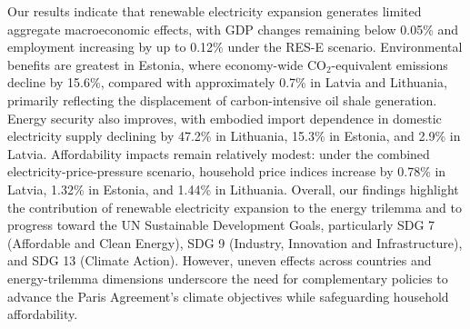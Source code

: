 \documentclass[10pt]{article}
\begin{document}
Our results indicate that renewable electricity expansion generates limited aggregate macroeconomic effects, 
with GDP changes remaining below 0.05\% and employment increasing by up to 0.12\% under the RES-E scenario. 
Environmental benefits are greatest in Estonia, where economy-wide CO$_2$-equivalent emissions decline by 15.6\%, 
compared with approximately 0.7\% in Latvia and Lithuania, primarily reflecting the displacement of carbon-intensive oil shale generation.
Energy security also improves, with embodied import dependence in domestic electricity supply declining by 47.2\% in Lithuania, 
15.3\% in Estonia, and 2.9\% in Latvia. Affordability impacts remain relatively modest: under the combined electricity-price-pressure 
scenario, household price indices increase by 0.78\% in Latvia, 1.32\% in Estonia, and 1.44\% in Lithuania. 
Overall, our findings highlight the contribution of renewable electricity expansion to the energy trilemma 
and to progress toward the UN Sustainable Development Goals, particularly SDG 7 (Affordable and Clean Energy), 
SDG 9 (Industry, Innovation and Infrastructure), and SDG 13 (Climate Action). However, uneven 
effects across countries and energy-trilemma dimensions underscore the need for complementary policies 
to advance the Paris Agreement's climate objectives while safeguarding household affordability.
% 
% 
\end{document}
